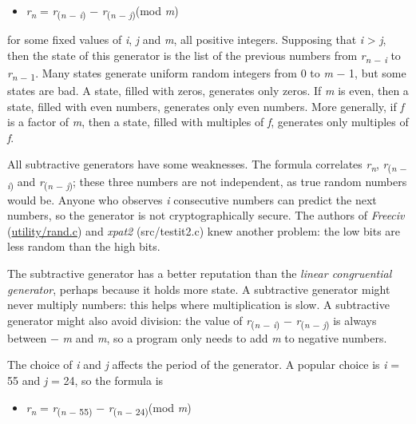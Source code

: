 \begin{itemize}
\begin{itemize}
\item
  \emph{r}\textsubscript{\emph{n}} = \emph{r}\textsubscript{(\emph{n} −
  \emph{i})} − \emph{r}\textsubscript{(\emph{n} − \emph{j})}(mod
  \emph{m})
\end{itemize}

for some fixed values of \emph{i}, \emph{j} and \emph{m}, all positive
integers. Supposing that \emph{i} \textgreater{} \emph{j}, then the
state of this generator is the list of the previous numbers from
\emph{r}\textsubscript{\emph{n} − \emph{i}} to
\emph{r}\textsubscript{\emph{n} − 1}. Many states generate uniform
random integers from 0 to \emph{m} − 1, but some states are bad. A
state, filled with zeros, generates only zeros. If \emph{m} is even,
then a state, filled with even numbers, generates only even numbers.
More generally, if \emph{f} is a factor of \emph{m}, then a state,
filled with multiples of \emph{f}, generates only multiples of \emph{f}.

All subtractive generators have some weaknesses. The formula correlates
\emph{r}\textsubscript{\emph{n}}, \emph{r}\textsubscript{(\emph{n} −
\emph{i})} and \emph{r}\textsubscript{(\emph{n} − \emph{j})}; these
three numbers are not independent, as true random numbers would be.
Anyone who observes \emph{i} consecutive numbers can predict the next
numbers, so the generator is not cryptographically secure. The authors
of \emph{Freeciv}
(\href{http://svn.gna.org/viewcvs/freeciv/trunk/utility/rand.c?view=markup}{utility/rand.c})
and \emph{xpat2} (src/testit2.c) knew another problem: the low bits are
less random than the high bits.

The subtractive generator has a better reputation than the
\emph{linear congruential
generator}, perhaps because it holds more state. A subtractive generator
might never multiply numbers: this helps where multiplication is slow. A
subtractive generator might also avoid division: the value of
\emph{r}\textsubscript{(\emph{n} − \emph{i})} −
\emph{r}\textsubscript{(\emph{n} − \emph{j})} is always between −
\emph{m} and \emph{m}, so a program only needs to add \emph{m} to
negative numbers.

The choice of \emph{i} and \emph{j} affects the period of the generator.
A popular choice is \emph{i} = 55 and \emph{j} = 24, so the formula is

\begin{itemize}
\item
  \emph{r}\textsubscript{\emph{n}} = \emph{r}\textsubscript{(\emph{n} −
  55)} − \emph{r}\textsubscript{(\emph{n} − 24)}(mod \emph{m})
\end{itemize}


\end{itemize}
